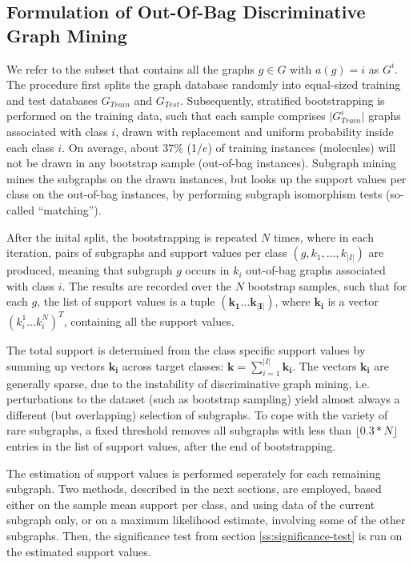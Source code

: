 \documentclass{article}
\begin{document}
\subsection{Formulation of Out-Of-Bag Discriminative Graph Mining}
\label{ss:oob-dgm}
We refer to the subset that contains all the graphs $g \in G$
with $a(g)=i$ as $G^i$.  The procedure first splits the graph database randomly
into equal-sized training and test databases $G_{Train}$ and $G_{Test}$.
Subsequently, stratified bootstrapping is performed on the training data, such
that each sample comprises $\vert G_{Train}^i\vert$ graphs associated with
class $i$, drawn with replacement and uniform probability inside each
class $i$.  On average, about 37\% (1/$e$) of training instances (molecules)
will not be drawn in any bootstrap sample (out-of-bag instances). Subgraph mining mines
the subgraphs on the drawn instances, but looks up the support values per
class on the out-of-bag instances, by performing subgraph isomorphism tests
(so-called ``matching'').

After the inital split, the bootstrapping is repeated $N$ times, where in each
iteration, pairs of subgraphs and support values per class
$(g,k_1,\ldots,k_{\vert I\vert})$ are produced, meaning that subgraph $g$
occurs in $k_i$ out-of-bag graphs associated with class $i$. The results are
recorded over the $N$ bootstrap samples, such that for each $g$, the list of
support values is a tuple $(\mathbf{k_1}\ldots\mathbf{k_{\vert I\vert}})$,
where $\mathbf{k_i}$ is a vector $(k_i^1\ldots k_i^N)^T$, containing all the
support values.  

The total support is determined from the class specific support values by
summing up vectors $\mathbf{k_i}$ across target classes:
$\mathbf{k}=\sum_{i=1}^{\vert I\vert} \mathbf{k_i}$. The vectors $\mathbf{k_i}$
are generally sparse, due to the instability of discriminative graph mining,
i.e. perturbations to the dataset (such as bootstrap sampling) yield almost
always a different (but overlapping) selection of subgraphs. To cope with the
variety of rare subgraphs, a fixed threshold removes all subgraphs with less
than $\lfloor0.3*N\rfloor$ entries in the list of support values, after the end
of bootstrapping.

The estimation of support values is performed seperately for each remaining
subgraph. Two methods, described in the next sections, are employed, based either
on the sample mean support per class, and using data of the current subgraph
only, or on a maximum likelihood estimate, involving some of the other
subgraphs. Then, the significance test from section \ref{ss:significance-test}
is run on the estimated support values. 
\end{document}
